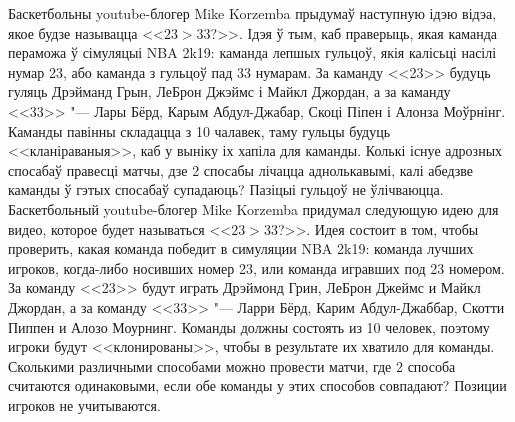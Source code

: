\documentclass[11pt, a4paper]{article}
\begin{document}
\begin{problemList}
\medskip

\problemItemSimple
{Баскетбольны youtube-блогер Mike Korzemba прыдумаў наступную ідэю відэа, якое будзе называцца <<$23 > 33$?>>.
Ідэя ў тым, каб праверыць, якая каманда пераможа ў сімуляцыі NBA 2k19: каманда лепшых гульцоў, якія калісьці насілі нумар 23, або каманда з гульцоў пад 33 нумарам.
За каманду <<23>> будуць гуляць Дрэйманд Грын, ЛеБрон Джэймс і Майкл Джордан,
а за каманду <<33>> "--- Лары Бёрд, Карым Абдул-Джабар, Скоці Піпен і Алонза Моўрнінг.
Каманды павінны складацца з 10 чалавек, таму гульцы будуць <<кланіраваныя>>, каб у выніку іх хапіла для каманды.
Колькі існуе адрозных спосабаў правесці матчы, дзе 2 спосабы лічацца аднолькавымі,
калі абедзве каманды ў гэтых спосабаў супадаюць? Пазіцыі гульцоў не ўлічваюцца.}
{Баскетбольный youtube-блогер Mike Korzemba придумал следующую идею для видео, которое будет называться <<$23 > 33$?>>.
Идея состоит в том, чтобы проверить, какая команда победит в симуляции NBA 2k19: команда лучших игроков, когда-либо носивших номер 23, или команда игравших под 23 номером.
За команду <<23>> будут играть Дрэймонд Грин, ЛеБрон Джеймс и Майкл Джордан,
а за команду <<33>> "--- Ларри Бёрд, Карим Абдул-Джаббар, Скотти Пиппен и Алозо Моурнинг.
Команды должны состоять из 10 человек, поэтому игроки будут <<клонированы>>, чтобы в результате их хватило для команды.
Сколькими различными способами можно провести матчи, где 2 способа считаются одинаковыми,
если обе команды у этих способов совпадают? Позиции игроков не учитываются.}

\end{problemList}
\end{document}
